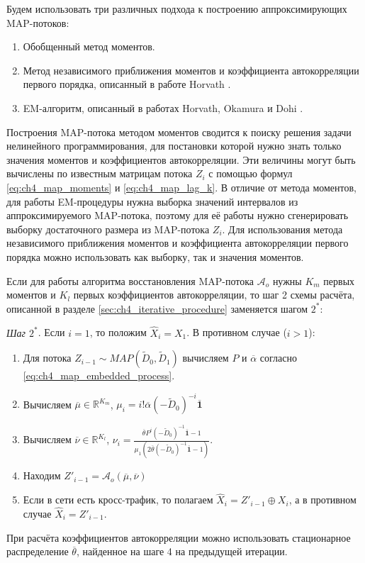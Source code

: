 Будем использовать три различных подхода к построению аппроксимирующих MAP-потоков:

\begin{enumerate}
\item Обобщенный метод моментов.
\item Метод независимого приближения моментов и коэффициента автокорреляции первого порядка, описанный в работе Horvath \cite{Horvath2005}.
\item EM-алгоритм, описанный в работах Horvath, Okamura и Dohi \cite{Okamura2009,Horvath2013}.
\end{enumerate}

Построения MAP-потока методом моментов сводится к поиску решения задачи нелинейного программирования, для постановки которой нужно знать только значения моментов и коэффициентов автокорреляции. Эти величины могут быть вычислены по известным матрицам потока $Z_i$ с помощью формул \eqref{eq:ch4_map_moments} и \eqref{eq:ch4_map_lag_k}. В отличие от метода моментов, для работы EM-процедуры нужна выборка значений интервалов из аппроксимируемого MAP-потока, поэтому для её работы нужно сгенерировать выборку достаточного размера из MAP-потока $Z_i$. Для использования метода независимого приближения моментов и коэффициента автокорреляции первого порядка можно использовать как выборку, так и значения моментов.

Если для работы алгоритма восстановления MAP-потока $\mathcal{A}_o$ нужны $K_m$ первых моментов и $K_l$ первых коэффициентов автокорреляции, то шаг 2 схемы расчёта, описанной в разделе \ref{sec:ch4_iterative_procedure} заменяется шагом $2^*$:

\textit{Шаг $2^*$}. Если $i = 1$, то положим $\hat{X}_i = X_1$. В противном случае ($i > 1$):
\begin{enumerate}
\item Для потока $Z_{i-1} \sim MAP(\tilde{D}_0, \tilde{D}_1)$ вычисляем $P$ и $\overline\alpha$ согласно \eqref{eq:ch4_map_embedded_process}. 
\item Вычисляем $\overline\mu \in \mathbb{R}^{K_m}$, $\mu_i = i! \overline\alpha (-\tilde{D}_0)^{-i} \overline{\mathbf{1}}$
\item Вычисляем $\overline\nu \in \mathbb{R}^{K_l}$, $\nu_i = \frac{\overline\theta P^i (-\tilde{D}_0)^{-1} \overline{\mathbf{1}} - 1}{\mu_1 \left( 2 \overline\theta (-\tilde{D}_0)^{-1} \overline{\mathbf{1}} - 1 \right)}$.
\item Находим $Z'_{i-1} = \mathcal{A}_o(\overline\mu, \overline\nu)$
\item Если в сети есть кросс-трафик, то полагаем $\hat{X}_i = Z'_{i-1} \oplus X_i$, а в противном случае $\hat{X}_i = Z'_{i-1}$.	
\end{enumerate}
При расчёта коэффициентов автокорреляции можно использовать стационарное распределение $\overline\theta$, найденное на шаге 4 на предыдущей итерации.

